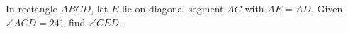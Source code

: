 In rectangle $ABCD$, let $E$ lie on diagonal segment $AC$ with $AE=AD$. Given $\angle ACD=24^\circ$, find $\angle CED$.
